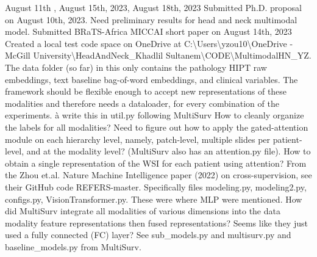\documentclass{article}%
\begin{document}
\newline%
\newline%
%
August 11th , August 15th, 2023, August 18th, 2023  %
\newline%
\newline%
%
Submitted Ph.D. proposal on August 10th, 2023. Need preliminary results for head and neck multimodal model. %
\newline%
\newline%
%
Submitted BRaTS{-}Africa MICCAI short paper on August 14th, 2023 %
\newline%
\newline%
%
Created a local test code space on OneDrive at C:\textbackslash{}Users\textbackslash{}yzou10\textbackslash{}OneDrive {-} McGill University\textbackslash{}HeadAndNeck\_Khadlil Sultanem\textbackslash{}CODE\textbackslash{}MultimodalHN\_YZ. The data folder (so far) in this only contains the pathology HIPT raw embeddings, text baseline bag{-}of{-}word embeddings, and clinical variables. %
\newline%
\newline%
%
The framework should be flexible enough to accept new representations of these modalities and therefore needs a dataloader, for every combination of the experiments. à write this in util.py following MultiSurv%
\newline%
\newline%
%
How to cleanly organize the labels for all modalities? %
\newline%
\newline%
%
Need to figure out how to apply the gated{-}attention module on each hierarchy level, namely, patch{-}level, multiple slides per patient{-}level, and at the modality level? (MultiSurv also has an attention.py file).  %
\newline%
\newline%
%
How to obtain a single representation of the WSI for each patient using attention? %
\newline%
\newline%
%
From the Zhou et.al. Nature Machine Intelligence paper (2022) on cross{-}supervision, see their GitHub code REFERS{-}master. Specifically files modeling.py, modeling2.py, configs.py, VisionTransformer.py. These were where MLP were mentioned. %
\newline%
\newline%
%
How did MultiSurv integrate all modalities of various dimensions into the data modality feature representations then fused representations? Seems like they just used a fully connected (FC) layer? See sub\_models.py and multisurv.py and baseline\_models.py from MultiSurv. %
\end{document}
